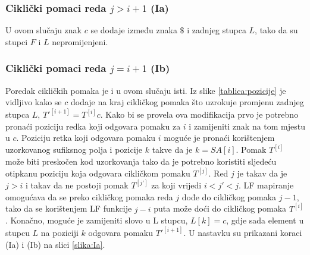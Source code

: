 \documentclass{ferseminar}
\begin{document}
\subsubsection{Ciklički pomaci reda $j>i+1$ (Ia)}
U ovom slučaju znak $c$ se dodaje između znaka $\$$ i zadnjeg stupca $L$, tako da su stupci $F$ i $L$ nepromijenjeni.
\subsubsection{Ciklički pomaci reda $j=i+1$ (Ib)}
Poredak cikličkih pomaka je i u ovom slučaju isti. Iz slike \ref{tablica:pozicije} je vidljivo kako se $c$ dodaje na kraj cikličkog pomaka što uzrokuje promjenu zadnjeg stupca $L$, $T'^{[i+1]}=T^{[i]}c$. Kako bi se provela ova modifikacija prvo je potrebno pronaći poziciju redka koji odgovara pomaku za $i$ i zamijeniti znak na tom mjestu u $c$. Poziciju retka koji odgovara pomaku  $i$ moguće je pronaći korištenjem uzorkovanog sufiksnog polja i pozicije $k$ takve da je $k=SA[i]$\cite{navaro}. Pomak $T^{[i]}$ može biti preskočen kod uzorkovanja tako da je potrebno koristiti sljedeću otipkanu poziciju koja odgovara cikličkom pomaku $T^{[j]}$. Red $j$ je takav da je $j>i$ i takav da ne postoji pomak $T^{[j']}$ za koji vrijedi $i<j'<j$. LF mapiranje omogućava da se preko cikličkog pomaka reda $j$ dođe do cikličkog pomaka $j-1$, tako da se korištenjem LF funkcije $j-i$ puta može doći do cikličkog pomaka $T^{[i]}$. Konačno, moguće je zamijeniti slovo u L stupcu, $L[k]=c$, gdje sada element u stupcu $L$ na poziciji $k$ odgovara pomaku $T'^{[i+1]}$.
U nastavku su prikazani koraci (Ia) i (Ib) na slici \ref{slika:Ia}.
\end{document}
